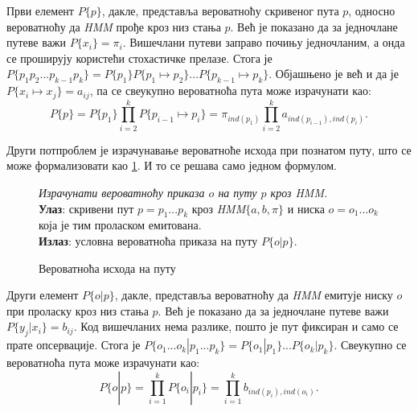 \documentclass[12pt,oneside]{memoir}
\newenvironment{problem}[1][!ht]
{\renewcommand{\algorithmcfname}{Проблем}
\begin{figure}[!ht]
\centering
  \begin{minipage}{.94\linewidth}
	\begin{algorithm}[#1]%
  }{\end{algorithm}
  \end{minipage}
\end{figure}}
\begin{document}
\begin{CJK}{UTF8}{ipxm}
Први елемент $P\{p\}$, дакле, представља вероватноћу скривеног пута $p$, односно вероватноћу да \textit{HMM} прође кроз низ стања $p$. Већ је показано да за једночлане путеве важи $P\{x_i\} = \pi_i$. Вишечлани путеви заправо почињу једночланим, а онда се проширују користећи стохастичке прелазе. Стога је $P\{p_1p_2...p_{k-1}p_k\} = P\{p_1\}P\{p_1 \mapsto p_2\}...P\{p_{k-1} \mapsto p_k\}$. Објашњено је већ и да је $P\{x_i \mapsto x_j\} = a_{ij}$, па се свеукупно вероватноћа пута може израчунати као: $$P\{p\} = P\{p_1\} \prod_{i=2}^k P\{p_{i-1} \mapsto p_i\} = \pi_{ind(p_1)} \prod_{i=2}^k a_{ind(p_{i-1}), ind(p_i)}.$$

Други потпроблем је израчунавање вероватноће исхода при познатом путу, што се може формализовати као \ref{prob:ishod}. И то се решава само једном формулом.

\begin{problem}[H]
  \SetAlgoLined
  \textit{Израчунати вероватноћу приказа $o$ на путу $p$ кроз \textit{HMM}.}\\
  \textbf{Улаз}: скривени пут $p = p_1...p_k$ кроз \textit{HMM}$\{a, b, \pi\}$ и ниска $o = o_1...o_k$ која је тим проласком емитована.\\
  \textbf{Излаз}: условна вероватноћа приказа на путу $P\{o | p\}$.
  \caption{Вероватноћа исхода на путу\cite{ba10b}}
  \label{prob:ishod}
\end{problem}

Други елемент $P\{o | p\}$, дакле, представља вероватноћу да \textit{HMM} емитује ниску $o$ при проласку кроз низ стања $p$. Већ је показано да за једночлане путеве важи $P\{y_j | x_i\} = b_{ij}$. Код вишечланих нема разлике, пошто је пут фиксиран и само се прате опсервације. Стога је $P\{o_1...o_k | p_1...p_k\} = P\{o_1 | p_1\}...P\{o_k | p_k\}$. Свеукупно се вероватноћа пута може израчунати као: $$P\{o | p\} = \prod_{i=1}^k P\{o_i | p_i\} = \prod_{i=1}^k b_{ind(p_i), ind(o_i)}.$$


\end{CJK}
\end{document}
